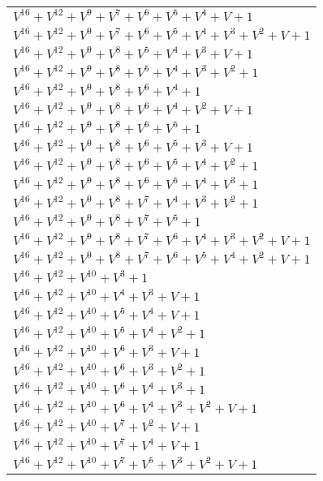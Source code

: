 \documentclass[12pt]{article}
\begin{document}
\begin{adjustwidth}{-4cm}{}
\begin{center}
\begin{longtable}{|l|}
$V^{16}  +V^{12}  +V^{9}  +V^{7}  +V^{6}  +V^{5}  +V^{4}  + V + 1$ \\
$V^{16}  +V^{12}  +V^{9}  +V^{7}  +V^{6}  +V^{5}  +V^{4}  +V^{3}  +V^{2}  + V + 1$ \\
$V^{16}  +V^{12}  +V^{9}  +V^{8}  +V^{5}  +V^{4}  +V^{3}  + V + 1$ \\
$V^{16}  +V^{12}  +V^{9}  +V^{8}  +V^{5}  +V^{4}  +V^{3}  +V^{2}  + 1$ \\
$V^{16}  +V^{12}  +V^{9}  +V^{8}  +V^{6}  +V^{4}  + 1$ \\
$V^{16}  +V^{12}  +V^{9}  +V^{8}  +V^{6}  +V^{4}  +V^{2}  + V + 1$ \\
$V^{16}  +V^{12}  +V^{9}  +V^{8}  +V^{6}  +V^{5}  + 1$ \\
$V^{16}  +V^{12}  +V^{9}  +V^{8}  +V^{6}  +V^{5}  +V^{3}  + V + 1$ \\
$V^{16}  +V^{12}  +V^{9}  +V^{8}  +V^{6}  +V^{5}  +V^{4}  +V^{2}  + 1$ \\
$V^{16}  +V^{12}  +V^{9}  +V^{8}  +V^{6}  +V^{5}  +V^{4}  +V^{3}  + 1$ \\
$V^{16}  +V^{12}  +V^{9}  +V^{8}  +V^{7}  +V^{4}  +V^{3}  +V^{2}  + 1$ \\
$V^{16}  +V^{12}  +V^{9}  +V^{8}  +V^{7}  +V^{5}  + 1$ \\
$V^{16}  +V^{12}  +V^{9}  +V^{8}  +V^{7}  +V^{6}  +V^{4}  +V^{3}  +V^{2}  + V + 1$ \\
$V^{16}  +V^{12}  +V^{9}  +V^{8}  +V^{7}  +V^{6}  +V^{5}  +V^{4}  +V^{2}  + V + 1$ \\
$V^{16}  +V^{12}  +V^{10}  +V^{3}  + 1$ \\
$V^{16}  +V^{12}  +V^{10}  +V^{4}  +V^{3}  + V + 1$ \\
$V^{16}  +V^{12}  +V^{10}  +V^{5}  +V^{4}  + V + 1$ \\
$V^{16}  +V^{12}  +V^{10}  +V^{5}  +V^{4}  +V^{2}  + 1$ \\
$V^{16}  +V^{12}  +V^{10}  +V^{6}  +V^{3}  + V + 1$ \\
$V^{16}  +V^{12}  +V^{10}  +V^{6}  +V^{3}  +V^{2}  + 1$ \\
$V^{16}  +V^{12}  +V^{10}  +V^{6}  +V^{4}  +V^{3}  + 1$ \\
$V^{16}  +V^{12}  +V^{10}  +V^{6}  +V^{4}  +V^{3}  +V^{2}  + V + 1$ \\
$V^{16}  +V^{12}  +V^{10}  +V^{7}  +V^{2}  + V + 1$ \\
$V^{16}  +V^{12}  +V^{10}  +V^{7}  +V^{4}  + V + 1$ \\
$V^{16}  +V^{12}  +V^{10}  +V^{7}  +V^{5}  +V^{3}  +V^{2}  + V + 1$ \\

\end{longtable}
\end{center}
\end{adjustwidth}
\end{document}

